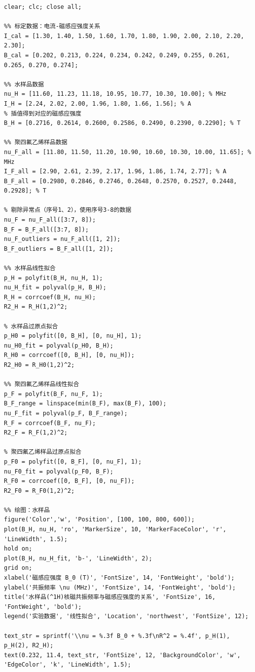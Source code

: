 ﻿\documentclass[12pt,a4paper]{article}
\begin{document}
\begin{lstlisting}[style=Matlab-boxed,caption={核磁共振数据处理代码}]
clear; clc; close all;

%% 标定数据：电流-磁感应强度关系
I_cal = [1.30, 1.40, 1.50, 1.60, 1.70, 1.80, 1.90, 2.00, 2.10, 2.20, 2.30];
B_cal = [0.202, 0.213, 0.224, 0.234, 0.242, 0.249, 0.255, 0.261, 0.265, 0.270, 0.274];

%% 水样品数据
nu_H = [11.60, 11.23, 11.18, 10.95, 10.77, 10.30, 10.00]; % MHz
I_H = [2.24, 2.02, 2.00, 1.96, 1.80, 1.66, 1.56]; % A
% 插值得到对应的磁感应强度
B_H = [0.2716, 0.2614, 0.2600, 0.2586, 0.2490, 0.2390, 0.2290]; % T

%% 聚四氟乙烯样品数据
nu_F_all = [11.80, 11.50, 11.20, 10.90, 10.60, 10.30, 10.00, 11.65]; % MHz
I_F_all = [2.90, 2.61, 2.39, 2.17, 1.96, 1.86, 1.74, 2.77]; % A
B_F_all = [0.2980, 0.2846, 0.2746, 0.2648, 0.2570, 0.2527, 0.2448, 0.2928]; % T

% 剔除异常点（序号1、2），使用序号3-8的数据
nu_F = nu_F_all([3:7, 8]);
B_F = B_F_all([3:7, 8]);
nu_F_outliers = nu_F_all([1, 2]);
B_F_outliers = B_F_all([1, 2]);

%% 水样品线性拟合
p_H = polyfit(B_H, nu_H, 1);
nu_H_fit = polyval(p_H, B_H);
R_H = corrcoef(B_H, nu_H);
R2_H = R_H(1,2)^2;

% 水样品过原点拟合
p_H0 = polyfit([0, B_H], [0, nu_H], 1);
nu_H0_fit = polyval(p_H0, B_H);
R_H0 = corrcoef([0, B_H], [0, nu_H]);
R2_H0 = R_H0(1,2)^2;

%% 聚四氟乙烯样品线性拟合
p_F = polyfit(B_F, nu_F, 1);
B_F_range = linspace(min(B_F), max(B_F), 100);
nu_F_fit = polyval(p_F, B_F_range);
R_F = corrcoef(B_F, nu_F);
R2_F = R_F(1,2)^2;

% 聚四氟乙烯样品过原点拟合
p_F0 = polyfit([0, B_F], [0, nu_F], 1);
nu_F0_fit = polyval(p_F0, B_F);
R_F0 = corrcoef([0, B_F], [0, nu_F]);
R2_F0 = R_F0(1,2)^2;

%% 绘图：水样品
figure('Color','w', 'Position', [100, 100, 800, 600]);
plot(B_H, nu_H, 'ro', 'MarkerSize', 10, 'MarkerFaceColor', 'r', 'LineWidth', 1.5); 
hold on;
plot(B_H, nu_H_fit, 'b-', 'LineWidth', 2);
grid on;
xlabel('磁感应强度 B_0 (T)', 'FontSize', 14, 'FontWeight', 'bold');
ylabel('共振频率 \nu (MHz)', 'FontSize', 14, 'FontWeight', 'bold');
title('水样品(^1H)核磁共振频率与磁感应强度的关系', 'FontSize', 16, 'FontWeight', 'bold');
legend('实验数据', '线性拟合', 'Location', 'northwest', 'FontSize', 12);

text_str = sprintf('\\nu = %.3f B_0 + %.3f\nR^2 = %.4f', p_H(1), p_H(2), R2_H);
text(0.232, 11.4, text_str, 'FontSize', 12, 'BackgroundColor', 'w', 'EdgeColor', 'k', 'LineWidth', 1.5);


\end{lstlisting}
\end{document}
